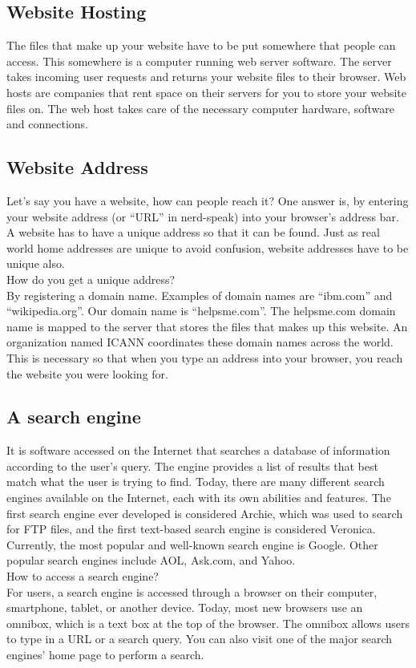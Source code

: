 \documentclass[11pt,a4paper,twoside]{article}
\begin{document}
\subsection{Website Hosting}
The files that make up your website have to be put somewhere that people can access. This somewhere is a computer running web server software.  The server takes incoming user requests and returns your website files to their browser. Web hosts are companies that rent space on their servers for you to store your website files on. The web host takes care of the necessary computer hardware, software and connections.
\subsection{Website Address}
Let’s say you have a website, how can people reach it? One answer is, by entering your website address (or “URL” in nerd-speak) into your browser’s address bar. A website has to have a unique address so that it can be found. Just as real world home addresses are unique to avoid confusion, website addresses have to be unique also.\\
How do you get a unique address?\\
By registering a domain name. Examples of domain names are “ibm.com” and “wikipedia.org”. Our domain name is “helpsme.com”. The helpsme.com domain name is mapped to the server that stores the files that makes up this website.
An organization named ICANN coordinates these domain names across the world. This is necessary so that when you type an address into your browser, you reach the website you were looking for.
\subsection{A search engine} 
It is software accessed on the Internet that searches a database of information according to the user's query. The engine provides a list of results that best match what the user is trying to find. Today, there are many different search engines available on the Internet, each with its own abilities and features. The first search engine ever developed is considered Archie, which was used to search for FTP files, and the first text-based search engine is considered Veronica. Currently, the most popular and well-known search engine is Google. Other popular search engines include AOL, Ask.com, and Yahoo.\\
How to access a search engine?\\
For users, a search engine is accessed through a browser on their computer, smartphone, tablet, or another device. Today, most new browsers use an omnibox, which is a text box at the top of the browser. The omnibox allows users to type in a URL or a search query. You can also visit one of the major search engines' home page to perform a search.
\end{document}
